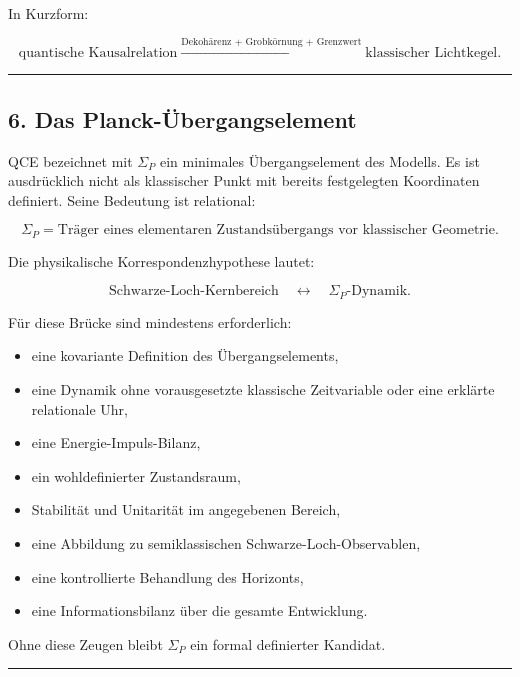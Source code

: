 \documentclass[
  11pt,
  a4paper,
]{article}
\providecommand{\tightlist}{%
  \setlength{\itemsep}{0pt}\setlength{\parskip}{0pt}}
\begin{document}
In Kurzform:

\[
\text{quantische Kausalrelation}
\xrightarrow{\text{Dekohärenz + Grobkörnung + Grenzwert}}
\text{klassischer Lichtkegel}.
\]

\begin{center}\rule{0.5\linewidth}{0.5pt}\end{center}

\subsection{6. Das
Planck-Übergangselement}\label{das-planck-uxfcbergangselement}

QCE bezeichnet mit \(\Sigma_P\) ein minimales Übergangselement des
Modells. Es ist ausdrücklich nicht als klassischer Punkt mit bereits
festgelegten Koordinaten definiert. Seine Bedeutung ist relational:

\[
\Sigma_P
=
\text{Träger eines elementaren Zustandsübergangs vor klassischer Geometrie}.
\]

Die physikalische Korrespondenzhypothese lautet:

\[
\text{Schwarze-Loch-Kernbereich}
\quad\longleftrightarrow\quad
\Sigma_P\text{-Dynamik}.
\]

Für diese Brücke sind mindestens erforderlich:

\begin{itemize}
\tightlist
\item
  eine kovariante Definition des Übergangselements,
\item
  eine Dynamik ohne vorausgesetzte klassische Zeitvariable oder eine
  erklärte relationale Uhr,
\item
  eine Energie-Impuls-Bilanz,
\item
  ein wohldefinierter Zustandsraum,
\item
  Stabilität und Unitarität im angegebenen Bereich,
\item
  eine Abbildung zu semiklassischen Schwarze-Loch-Observablen,
\item
  eine kontrollierte Behandlung des Horizonts,
\item
  eine Informationsbilanz über die gesamte Entwicklung.
\end{itemize}

Ohne diese Zeugen bleibt \(\Sigma_P\) ein formal definierter Kandidat.

\begin{center}\rule{0.5\linewidth}{0.5pt}\end{center}
\end{document}

